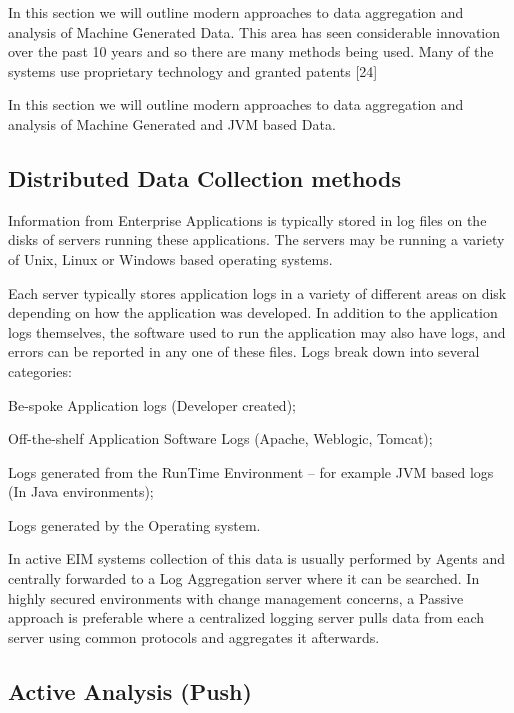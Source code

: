 \documentclass{llncs}
\begin{document}
In this section we will outline modern approaches to data aggregation and analysis of Machine Generated Data. This area has seen considerable innovation over the past 10 years and so there are many methods being used. Many of the systems use proprietary technology and granted patents [24]

In this section we will outline modern approaches to data aggregation and analysis of Machine Generated and JVM based Data.

\subsection{Distributed Data Collection methods}

Information from Enterprise Applications is typically stored in log files on the disks of servers running these applications. The servers may be running a variety of Unix, Linux or Windows based operating systems. 

Each server typically stores application logs in a variety of different areas on disk depending on how the application was developed. In addition to the application logs themselves, the software used to run the application may also have logs, and errors can be reported in any one of these files. Logs break down into several categories:

\begin{alpherate}
\item Be-spoke Application logs (Developer created);
\item Off-the-shelf Application Software Logs (Apache, Weblogic, Tomcat);
\item Logs generated from the RunTime Environment – for example JVM based logs (In Java environments);
\item Logs generated by the Operating system.
\end{alpherate}

In active EIM systems collection of this data is usually performed by Agents and centrally forwarded to a Log Aggregation server where it can be searched. In highly secured environments with change management concerns, a Passive approach is preferable where a centralized logging server pulls data from each server using common protocols and aggregates it afterwards.

\subsection{Active Analysis (Push)}
\end{document}

